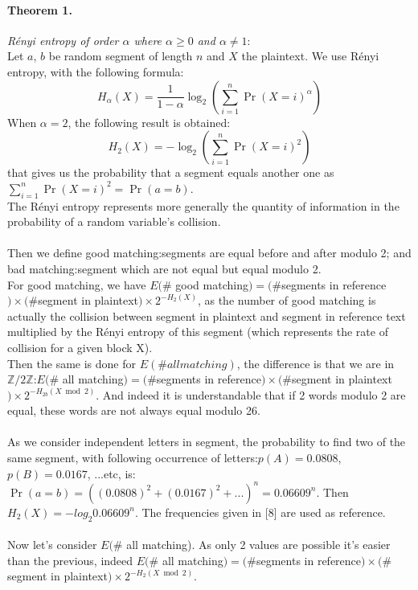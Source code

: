 \documentclass{article}
\begin{document}
\paragraph{Theorem 1.}\textit{R\'enyi entropy of order $\alpha$ where $\alpha \geq 0$ and $\alpha \neq 1$}:
\\
Let $a$, $b$ be random segment of length $n$ and $X$ the plaintext. We use R\'enyi entropy, with the following formula:\\
$$H_{\alpha}(X) = \frac{1}{1-\alpha}\log_{2}(\sum_{i=1}^{n}{\Pr(X=i)^{\alpha}})$$ 
When $\alpha = 2$, the following result is obtained:
$$H_{2}(X) = -\log_{2}(\sum_{i=1}^{n}{\Pr(X=i)^{2}})$$ that gives us the probability that a segment equals another one as $\sum_{i=1}^{n}{\Pr(X=i)^{2}} =\Pr(a=b)$.\\
The R\'enyi entropy represents more generally the quantity of information in the probability of a random variable's collision.\\
\\
Then we define good matching:segments are equal before and after modulo 2; and bad matching:segment which are not equal but equal modulo 2.\\
${}$\hspace{1em}For good matching, we have $E(\#$ good matching$) = (\# $segments in reference$) \times (\#$segment in plaintext$) \times 2^{-H_{2}(X)}$, as the number of good matching is actually the collision between segment in plaintext and segment in reference text multiplied by the R\'enyi entropy of this segment (which represents the rate of collision for a given block X).\\
Then the same is done for  $E(\# all matching)$, the difference is that we are in $\mathbb{Z}/2\mathbb{Z}$:$E(\#$ all matching$) = (\# $segments in reference$) \times (\#$segment in plaintext$) \times 2^{-H_{2b}(X \bmod 2)}$. And indeed it is understandable that if 2 words modulo 2 are equal, these words are not always equal modulo 26.\\
\\
As we consider independent letters in segment, the probability to find two of the same segment, with following occurrence of letters:$p(A)=0.0808$, $p(B)=0.0167$, ...etc, is:$\Pr(a=b)=((0.0808)^{2} +(0.0167)^{2} + ...)^{n} =0.06609^{n}$. Then $H_{2}(X) = -log_{2}0.06609^{n}$. The frequencies given in [8] are used as reference.\\
\\
${}$\hspace{1em}Now let's consider $E(\#$ all matching). As only 2 values are possible it's easier than the previous, indeed $E(\#$ all matching$) =(\# $segments in reference$) \times (\#$segment in plaintext$) \times 2^{-H_{2}(X \bmod 2)}$.\\
\end{document}
